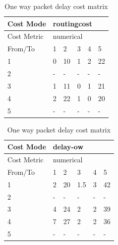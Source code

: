 \begin{table}
    \centering
    \begin{subtable}{.46\linewidth}
        \centering
        \begin{tabular}{|l|l|l|l|l|l|}
        \hline
        Cost Mode   & \multicolumn{5}{|l|}{routingcost} \\ \hline
        Cost Metric & \multicolumn{5}{|l|}{numerical}   \\ \hline
        From/To     & 1    & 2     & 3   & 4   & 5      \\ \hline
        1           & 0    & 10    & 1   & 2   & 22     \\ \hline
        2           & -    & -     & -   & -   & -      \\ \hline
        3           & 1    & 11    & 0   & 1   & 21     \\ \hline
        4           & 2    & 22    & 1   & 0   & 20     \\ \hline
        5           & -    & -     & -   & -   & -      \\ \hline
        \end{tabular}
    \caption{Routing cost cost matrix}
    \end{subtable}
    \begin{subtable}{.46\linewidth}
        \centering
        \begin{tabular}{|l|l|l|l|l|l|}
        \hline
        Cost Mode   & \multicolumn{5}{|l|}{delay-ow}    \\ \hline
        Cost Metric & \multicolumn{5}{|l|}{numerical}   \\ \hline
        From/To     & 1    & 2     & 3   & 4   & 5      \\ \hline
        1           & 2    & 20    & 1.5 & 3   & 42     \\ \hline
        2           & -    & -     & -   & -   & -      \\ \hline
        3           & 4    & 24    & 2   & 2   & 39     \\ \hline
        4           & 7    & 27    & 2   & 2   & 36     \\ \hline
        5           & -    & -     & -   & -   & -      \\ \hline
        \end{tabular}
    \caption{One way packet delay cost matrix}
    \end{subtable}
    \begin{subtable}{.65\linewidth}
        \centering
        \hspace{-4em}

\end{subtable}
\end{table}
